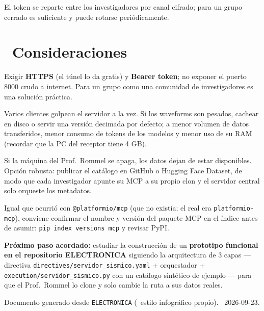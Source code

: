 \documentclass[11pt,a4paper]{article}
\newcommand{\iconotexto}[2]{\textcolor{cyanNeon}{\faIcon{#1}}~#2}
\begin{document}
El token se reparte entre los investigadores por canal cifrado; para un grupo cerrado es suficiente
y puede rotarse peri\'odicamente.

\section{\iconotexto{shield-alt}{Consideraciones}}

\begin{tcolorbox}[cajaRecomendacion, title={\faIcon{lock}~Seguridad}]
Exigir \textbf{HTTPS} (el t\'unel lo da gratis) y \textbf{Bearer token}; no exponer el puerto 8000
crudo a internet. Para un grupo como una comunidad de investigadores es una soluci\'on pr\'actica.
\end{tcolorbox}

\begin{tcolorbox}[cajaRecomendacion, title={\faIcon{memory}~Concurrencia y carga}]
Varios clientes golpean el servidor a la vez. Si los waveforms son pesados, cachear en disco o servir
una versi\'on decimada por defecto; a menor volumen de datos transferidos, menor consumo de tokens de
los modelos y menor uso de su RAM (recordar que la PC del receptor tiene 4 GB).
\end{tcolorbox}

\begin{tcolorbox}[cajaRecomendacion, title={\faIcon{cloud-upload-alt}~Disponibilidad y respaldo}]
Si la m\'aquina del Prof.\ Rommel se apaga, los datos dejan de estar disponibles. Opci\'on robusta:
publicar el cat\'alogo en GitHub o Hugging Face Dataset, de modo que cada investigador apunte su MCP a
su propio clon y el servidor central solo orqueste los metadatos.
\end{tcolorbox}

\begin{tcolorbox}[cajaMejora, title={\faIcon{exclamation-triangle}~Verificaci\'on del paquete}]
Igual que ocurri\'o con \texttt{@platformio/mcp} (que no exist\'ia; el real era \texttt{platformio-mcp}),
conviene confirmar el nombre y versi\'on del paquete MCP en el \'indice antes de asumir:
\texttt{pip index versions mcp} y revisar PyPI.
\end{tcolorbox}

\vspace{10pt}
\begin{tcolorbox}[cajaConcepto]
\textbf{Pr\'oximo paso acordado:} estudiar la construcci\'on de un \textbf{prototipo funcional en el
repositorio ELECTRONICA} siguiendo la arquitectura de 3 capas --- directiva
\texttt{directives/servidor\_sismico.yaml} + orquestador + \texttt{execution/servidor\_sismico.py}
con un cat\'alogo sint\'etico de ejemplo --- para que el Prof.\ Rommel lo clone y solo cambie la ruta a
sus datos reales.
\end{tcolorbox}

\vspace{12pt}
\begin{center}
\footnotesize\color{grisTexto}
Documento generado desde \texttt{ELECTRONICA} (\textbullet\ estilo infogr\'afico propio). \textbullet\ 2026-09-23.
\end{center}
\end{document}
